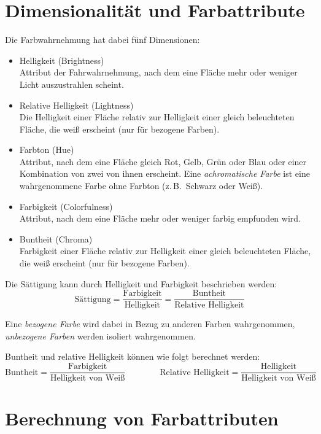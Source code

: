 \documentclass[a4paper, 11pt, accentcolor = tud3b]{tudreport}
\newcommand{\zB}{z.\,B.~}
\begin{document}
		\section{Dimensionalität und Farbattribute}
			Die Farbwahrnehmung hat dabei fünf Dimensionen:
			\begin{itemize}
				\item Helligkeit (Brightness) \\ Attribut der Fahrwahrnehmung, nach dem eine Fläche mehr oder weniger Licht auszustrahlen scheint.
				\item Relative Helligkeit (Lightness) \\ Die Helligkeit einer Fläche relativ zur Helligkeit einer gleich beleuchteten Fläche, die weiß erscheint (nur für bezogene Farben).
				\item Farbton (Hue) \\ Attribut, nach dem eine Fläche gleich Rot, Gelb, Grün oder Blau oder einer Kombination von zwei von ihnen erscheint. Eine \emph{achromatische Farbe} ist eine wahrgenommene Farbe ohne Farbton (\zB Schwarz oder Weiß).
				\item Farbigkeit (Colorfulness) \\ Attribut, nach dem eine Fläche mehr oder weniger farbig empfunden wird.
				\item Buntheit (Chroma) \\ Farbigkeit einer Fläche relativ zur Helligkeit einer gleich beleuchteten Fläche, die weiß erscheint (nur für bezogene Farben).
			\end{itemize}
			Die Sättigung kann durch Helligkeit und Farbigkeit beschrieben werden:
			\begin{equation*}
				\text{Sättigung} = \frac{\text{Farbigkeit}}{\text{Helligkeit}} = \frac{\text{Buntheit}}{\text{Relative Helligkeit}}
			\end{equation*}
			
			Eine \emph{bezogene Farbe} wird dabei in Bezug zu anderen Farben wahrgenommen, \emph{unbezogene Farben} werden isoliert wahrgenommen.
			
			Buntheit und relative Helligkeit können wie folgt berechnet werden:
			\begin{equation*}
				\text{Buntheit} = \frac{\text{Farbigkeit}}{\text{Helligkeit von Weiß}} \quad\quad\quad\quad \text{Relative Helligkeit} = \frac{\text{Helligkeit}}{\text{Helligkeit von Weiß}}
			\end{equation*}

		\section{Berechnung von Farbattributen}
\end{document}
